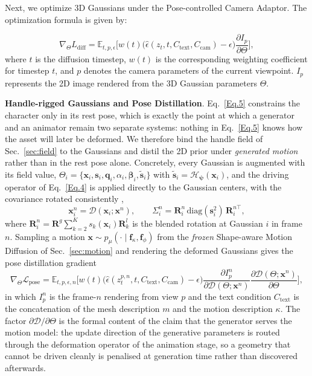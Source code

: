 \documentclass[lettersize,journal]{IEEEtran}
\begin{document}
Next, we optimize 3D Gaussians under the Pose-controlled Camera Adaptor. The optimization formula is given by:

\begin{equation} \label{Eq.5}
\nabla_{\Theta} L_{\text{diff}} = \mathbb{E}_{t, p, \epsilon} \Big[ w(t) \big( \hat{\epsilon}(z_t, t, C_{\text{text}}, C_{\text{cam}}) - \epsilon \big) \frac{\partial I_p}{\partial \Theta} \Big],
\end{equation}
where \(t\) is the diffusion timestep, \(w(t)\) is the corresponding weighting coefficient for timestep \(t\), and \(p\) denotes the camera parameters of the current viewpoint. \(I_p\) represents the 2D image rendered from the 3D Gaussian parameters \(\Theta\).

\textbf{Handle-rigged Gaussians and Pose Distillation}. Eq.~\ref{Eq.5} constrains the
character only in its rest pose, which is exactly the point at which a generator and an
animator remain two separate systems: nothing in Eq.~\ref{Eq.5} knows how the asset will later
be deformed. We therefore bind the handle field of Sec.~\ref{sec:field} to the Gaussians and
distil the 2D prior under \textit{generated motion} rather than in the rest pose alone.
Concretely, every Gaussian is augmented with its field value,
$\Theta_i=\{\mathbf{x}_i,\mathbf{s}_i,\mathbf{q}_i,\alpha_i,\bm{\beta}_i,
\tilde{\bm{s}}_i\}$ with $\tilde{\bm{s}}_i=\mathcal{H}_{\bm{\psi}}(\mathbf{x}_i)$, and the
driving operator of Eq.~\ref{Eq.4} is applied directly to the Gaussian centers, with the
covariance rotated consistently \cite{dabhi2026rat4d},
\begin{equation} \label{Eq.gsdeform}
\mathbf{x}_i^{n}=\mathcal{D}(\mathbf{x}_i;\bm{x}^{n}),
\qquad
\Sigma_i^{n}=\bm{R}_i^{n}\,\mathrm{diag}(\mathbf{s}_i^{2})\,\bm{R}_i^{n\top},
\end{equation}
where $\bm{R}_i^{n}=\bm{R}^{g}\sum_{k=2}^{K}s_{k}(\mathbf{x}_i)\bm{R}^{l}_{k}$ is the blended
rotation at Gaussian $i$ in frame $n$. Sampling a motion
$\bm{x}\sim p_{\mu}(\cdot\mid\bm{f}_{\kappa},\bm{f}_{\phi})$ from the \textit{frozen} Shape-aware
Motion Diffusion of Sec.~\ref{sec:motion} and rendering the deformed Gaussians gives the pose
distillation gradient
\begin{equation} \label{Eq.posesds}
\nabla_{\Theta}\mathcal{L}_{\text{pose}}=
\mathbb{E}_{t,p,\epsilon,n}\Big[
w(t)\big(\hat{\epsilon}(z_{t}^{p,n},t,C_{\text{text}},C_{\text{cam}})-\epsilon\big)
\frac{\partial I_{p}^{n}}{\partial\mathcal{D}(\Theta;\bm{x}^{n})}
\frac{\partial\mathcal{D}(\Theta;\bm{x}^{n})}{\partial\Theta}\Big],
\end{equation}
in which $I_{p}^{n}$ is the frame-$n$ rendering from view $p$ and the text condition
$C_{\text{text}}$ is the concatenation of the mesh description $m$ and the motion description
$\kappa$. The factor $\partial\mathcal{D}/\partial\Theta$ is the formal content of the claim
that the generator serves the motion model: the update direction of the generative parameters
is routed through the deformation operator of the animation stage, so a geometry that cannot
be driven cleanly is penalised at generation time rather than discovered afterwards.
\end{document}

